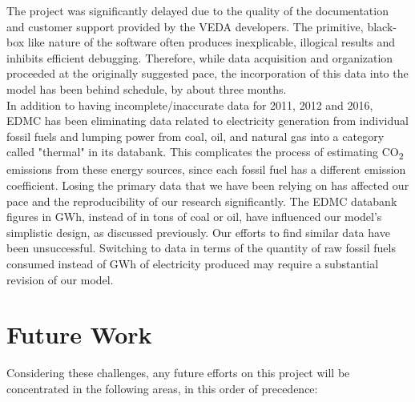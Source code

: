 \documentclass[14pt,a4paper]{article} %
\begin{document}
The project was significantly delayed due to the quality of the documentation and customer support provided by the VEDA developers. The primitive, black-box like nature of the software often produces inexplicable, illogical results and inhibits efficient debugging. Therefore, while data acquisition and organization proceeded at the originally suggested pace, the incorporation of this data into the model has been behind schedule, by about three months. \\

In addition to having incomplete/inaccurate data for 2011, 2012 and 2016, EDMC has been eliminating data related to electricity generation from individual fossil fuels and lumping power from coal, oil, and natural gas into a category called "thermal" in its databank. This complicates the process of estimating CO\textsubscript{2} emissions from these energy sources, since each fossil fuel has a different emission coefficient. Losing the primary data that we have been relying on has affected our pace and the reproducibility of our research significantly. The EDMC databank figures in GWh, instead of in tons of coal or oil, have influenced our model's simplistic design, as discussed previously. Our efforts to find similar data have been unsuccessful. Switching to data in terms of the quantity of raw fossil fuels consumed instead of GWh of electricity produced may require a substantial revision of our model. 

\section{Future Work} 
Considering these challenges, any future efforts on this project will be concentrated in the following areas, in this order of precedence:
\end{document}
